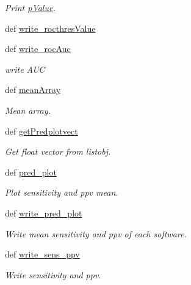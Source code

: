 \begin{DoxyCompactItemize}
\begin{DoxyCompactList}\small\item\em \-Print \hyperlink{namespaceirna_1_1iRNA__stat_1_1pValue}{p\-Value}. \end{DoxyCompactList}\item 
def \hyperlink{classirna_1_1iRNA__stat_1_1Draw__data_1_1draw__data_a6552a0ee25ddde78245d87b7d70afa12}{write\-\_\-rocthres\-Value}
\item 
def \hyperlink{classirna_1_1iRNA__stat_1_1Draw__data_1_1draw__data_aec18e7a5ee80938b74e708ebc91952a5}{write\-\_\-roc\-Auc}
\begin{DoxyCompactList}\small\item\em write \-A\-U\-C \end{DoxyCompactList}\item 
def \hyperlink{classirna_1_1iRNA__stat_1_1Draw__data_1_1draw__data_abfd96b9833f6e720e05602c384175138}{mean\-Array}
\begin{DoxyCompactList}\small\item\em \-Mean array. \end{DoxyCompactList}\item 
def \hyperlink{classirna_1_1iRNA__stat_1_1Draw__data_1_1draw__data_aae1b6dfd3bdc963389d446865e7a5a71}{get\-Predplotvect}
\begin{DoxyCompactList}\small\item\em \-Get float vector from listobj. \end{DoxyCompactList}\item 
def \hyperlink{classirna_1_1iRNA__stat_1_1Draw__data_1_1draw__data_a78ec0ca02bc6e91a1b4d7abe49c73561}{pred\-\_\-plot}
\begin{DoxyCompactList}\small\item\em \-Plot sensitivity and ppv mean. \end{DoxyCompactList}\item 
def \hyperlink{classirna_1_1iRNA__stat_1_1Draw__data_1_1draw__data_a316efd7e04d8dc7713e73e22a36ad3d7}{write\-\_\-pred\-\_\-plot}
\begin{DoxyCompactList}\small\item\em \-Write mean sensitivity and ppv of each software. \end{DoxyCompactList}\item 
def \hyperlink{classirna_1_1iRNA__stat_1_1Draw__data_1_1draw__data_a3713387f380eadf8d1a861b3fb34607b}{write\-\_\-sens\-\_\-ppv}
\begin{DoxyCompactList}\small\item\em \-Write sensitivity and ppv. \end{DoxyCompactList}\item 

\end{DoxyCompactItemize}
